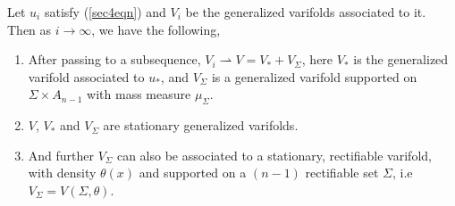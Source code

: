 \begin{theo}
Let $u_i$ satisfy (\ref{sec4eqn}) and $V_i$ be the generalized varifolds associated to it. Then as $i \to \infty$, we have the following,
\begin{enumerate}
    \item After passing to a subsequence, $V_i \rightharpoonup V= V_* + V_{\Sigma}$, here $V_*$ is the generalized varifold associated to $u_*$, and $V_{\Sigma}$ is a generalized varifold supported on $\Sigma \times A_{n-1}$ with mass measure $\mu_{\Sigma}$.
    \item $V$, $V_*$ and $V_{\Sigma}$ are stationary generalized varifolds. 
    \item And further $V_{\Sigma}$ can also be associated to a stationary, rectifiable varifold, with density $\theta(x)$ and supported on a $(n-1)$ rectifiable set $\Sigma$, i.e $V_{\Sigma} = V(\Sigma, \theta)$.
\end{enumerate}
\end{theo}

